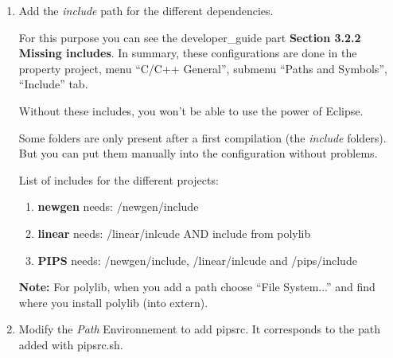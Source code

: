 \documentclass[a4paper]{article}
\begin{document}
\begin{enumerate}
\item Add the \emph{include} path for the different dependencies.
\label{enum:it:addsymb}

For this purpose you can see the developer\_guide part \textbf{Section 3.2.2 Missing includes}.
In summary, these configurations are done in the property project, menu ``C/C++ General'', submenu ``Paths and Symbols'', ``Include'' tab.

Without these includes, you won't be able to use the power of Eclipse.

Some folders are only present after a first compilation (the \textit{include} folders). 
But you can put them manually into the configuration without problems.

List of includes for the different projects:
\begin{enumerate}
\item \textbf{newgen} needs: /newgen/include
\item \textbf{linear} needs: /linear/inlcude AND include from polylib
\item \textbf{PIPS} needs:   /newgen/include, /linear/inlcude and /pips/include
\end{enumerate}

\textbf{Note:} For polylib, when you add a path choose ``File System...'' and find where you install polylib (into extern).

\item Modify the \emph{Path} Environnement to add pipsrc. 
It corresponds to the path added with pipsrc.sh.
\label{enum:it:addpath}


\end{enumerate}
\end{document}
